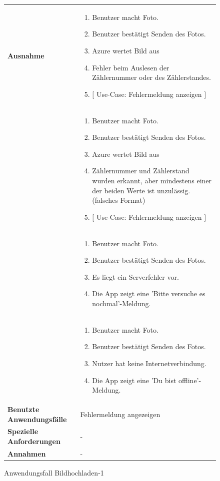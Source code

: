 \begin{figure}[h]
	\centering
	\begin{tabularx}{\textwidth}{ X | X }
	 \hline
		\textbf{Ausnahme} &
		\begin{enumerate}
			\item Benutzer macht Foto.
			\item Benutzer bestätigt Senden des Fotos.
			\item Azure wertet Bild aus
			\item Fehler beim Auslesen der Zählernummer oder des Zählerstandes.
			\item $\lbrack$ Use-Case: Fehlermeldung anzeigen $\rbrack$
		\end{enumerate} \\ &
		\begin{enumerate}
			\item Benutzer macht Foto.
			\item Benutzer bestätigt Senden des Fotos.
			\item Azure wertet Bild aus
			\item Zählernummer und Zählerstand wurden erkannt, aber mindestens einer der beiden Werte ist unzulässig. (falsches Format)
			\item $\lbrack$ Use-Case: Fehlermeldung anzeigen $\rbrack$
		\end{enumerate} \\  &
		\begin{enumerate}
			\item Benutzer macht Foto.
			\item Benutzer bestätigt Senden des Fotos.
			\item Es liegt ein Serverfehler vor.
			\item Die App zeigt eine 'Bitte versuche es nochmal'-Meldung.
		\end{enumerate} \\  &
		\begin{enumerate}
			\item Benutzer macht Foto.
			\item Benutzer bestätigt Senden des Fotos.
			\item Nutzer hat keine Internetverbindung.
			\item Die App zeigt eine 'Du bist offline'-Meldung.
		\end{enumerate} \\ \hline
		\textbf{Benutzte Anwendungsfälle} & Fehlermeldung angezeigen \\ \hline
		\textbf{Spezielle Anforderungen} & - \\ \hline
		\textbf{Annahmen} & -
	\end{tabularx}
	\caption{Anwendungsfall Bildhochladen-1}
	\label{fig:anwendungsfall-server-tabelle-xx-1}
\end{figure}

